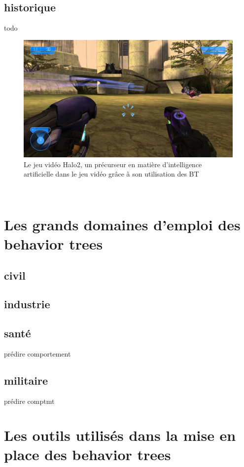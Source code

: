 \documentclass[titlepage]{article}
\begin{document}
		\subsection{historique}
	todo
	\\
	\begin{figure}[h!]
		\includegraphics[width=\linewidth]{img/halo2.jpg}
		\caption{Le jeu vidéo Halo2, un précurseur en matière d'intelligence artificielle dans le jeu vidéo grâce à son utilisation des BT \cite{wikipedia_halo}}
		\label{fig:BT1}
	\end{figure}
	\\
	
	\clearpage
	\section{Les grands domaines d'emploi des behavior trees}
		\subsection{civil}
	
		\subsection{industrie}
	
		\subsection{santé}
	prédire comportement
	
		\subsection{militaire}
	prédire comptmt
	
	\clearpage
	\section{Les outils utilisés dans la mise en place des behavior trees}
\end{document}
